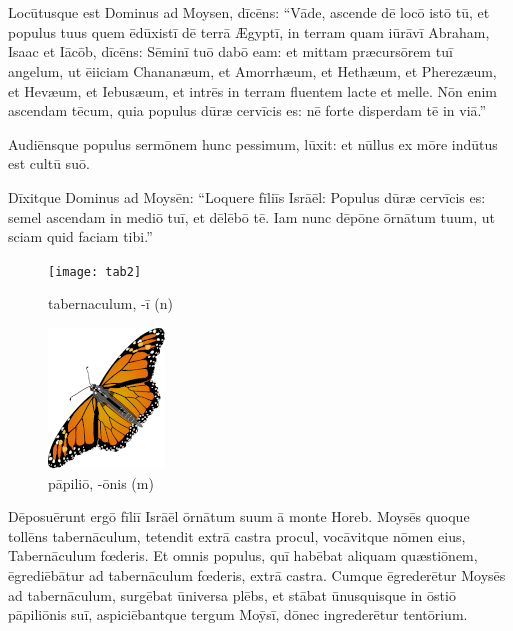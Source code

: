 \chapter{}


\thispagestyle{empty}

Locūtusque est Dominus ad Moysen, dīcēns: ``Vāde, ascende
dē locō istō tū, et populus tuus quem ēdūxistī dē terrā Ægyptī, in terram
quam iūrāvī Abraham, Isaac et Iācōb, dīcēns:
Sēminī tuō dabō eam: 
et mittam præcursōrem tuī
angelum, ut ēiiciam Chananæum, et
Amorrhæum, et Hethæum, et Pherezæum, et Hevæum, et Iebusæum, 
et intrēs in
terram fluentem lacte et melle. Nōn enim ascendam tēcum, quia populus dūræ
cervīcis es: nē
forte disperdam tē in viā.''

Audiēnsque
populus sermōnem hunc pessimum, lūxit: et nūllus ex mōre indūtus est cultū
suō. 

Dīxitque Dominus ad Moysēn: ``Loquere fīliīs Isrāēl:
Populus dūræ cervīcis es: semel ascendam in mediō tuī, et dēlēbō tē. Iam
nunc dēpōne ōrnātum tuum, ut sciam quid faciam tibi.''

\begin{figure}[h!]
    \begin{minipage}[hp]{0.5\linewidth}
        \centering
        \texttt{[image: tab2]}
        \caption{tabernaculum, -ī (n)}
    \end{minipage}%
    \begin{minipage}[hp]{0.5\linewidth}
        \centering
        \includegraphics{papilio}
        \caption{pāpiliō, -ōnis (m)}
    \end{minipage}
\end{figure}

Dēposuērunt ergō
fīliī Isrāēl ōrnātum suum ā monte Horeb. 
Moysēs quoque tollēns tabernāculum,
tetendit extrā castra procul, vocāvitque nōmen eius, Tabernāculum fœderis.
Et omnis populus, quī habēbat aliquam quæstiōnem, ēgrediēbātur ad
tabernāculum fœderis, extrā castra. 
Cumque ēgrederētur Moysēs ad
tabernāculum, surgēbat ūniversa plēbs, et stābat ūnusquisque in ōstiō pāpiliōnis
suī, aspiciēbantque tergum Moȳsī, dōnec ingrederētur tentōrium. 

